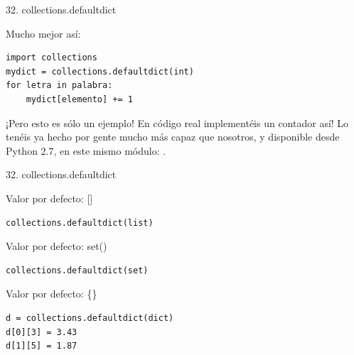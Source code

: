 \documentclass[14pt]{beamer}
\begin{document}
\begin{frame}[fragile]{32. collections.defaultdict}
  \footnotesize
  \begin{exampleblock}
    {Mucho mejor así:}
    \begin{lstlisting}
import collections
mydict = collections.defaultdict(int)
for letra in palabra:
    mydict[elemento] += 1
    \end{lstlisting}
  \end{exampleblock}

  \small
  \begin{alertblock}{}
    \centering
    ¡Pero esto es sólo un ejemplo! En código real 
    implementéis un contador así! Lo tenéis ya hecho por gente mucho
    más capaz que nosotros, y disponible desde Python 2.7, en este
    mismo módulo:
    .
  \end{alertblock}
\end{frame}

\begin{frame}[fragile]{32. collections.defaultdict}
  \small
  \begin{exampleblock}
    {Valor por defecto: []}
    \begin{lstlisting}
collections.defaultdict(list)
    \end{lstlisting}
  \end{exampleblock}

  \small
  \begin{exampleblock}
    {Valor por defecto: set()}
    \begin{lstlisting}
collections.defaultdict(set)
    \end{lstlisting}
  \end{exampleblock}

  \begin{exampleblock}
    {Valor por defecto: \{\}}
    \begin{lstlisting}
d = collections.defaultdict(dict)
d[0][3] = 3.43
d[1][5] = 1.87
    \end{lstlisting}
  \end{exampleblock}
\end{frame}
\end{document}
